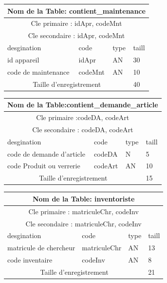 \vspace{2cm}

\begin{tabular}{ |p{5cm}||p{4cm}|p{3cm}|p{3cm}|  }
    \hline
    \multicolumn{4}{|c|}{Nom de la Table: contient\_maintenance } \\
    \hline
    \multicolumn{4}{|c|}{Cle primaire : idApr, codeMnt} \\
    \hline
    \multicolumn{4}{|c|}{Cle secondaire : idApr, codeMnt } \\
    \hline
    \hline
    desgination&code&type&taill \\
    \hline
    id appareil&idApr&AN&30 \\
    code de maintenance&codeMnt&AN&10 \\
    \hline
    \hline
    \multicolumn{3}{|c|}{Taille d’enregistrement} & 40\\
    \hline
\end{tabular}

\vspace{2cm}

\begin{tabular}{ |p{5cm}||p{4cm}|p{3cm}|p{3cm}|  }
    \hline
    \multicolumn{4}{|c|}{Nom de la Table:contient\_demande\_article } \\
    \hline
    \multicolumn{4}{|c|}{Cle primaire :codeDA, codeArt } \\
    \hline
    \multicolumn{4}{|c|}{Cle secondaire : codeDA, codeArt } \\
    \hline
    \hline
    desgination&code&type&taill \\
    \hline
    code de demande d'article&codeDA&N&5 \\
    code Produit ou verrerie&codeArt&AN&10 \\
    \hline
    \hline
    \multicolumn{3}{|c|}{Taille d’enregistrement} & 15\\
    \hline
\end{tabular}

\vspace{2cm}

\begin{tabular}{ |p{5cm}||p{4cm}|p{3cm}|p{3cm}|  }
    \hline
    \multicolumn{4}{|c|}{Nom de la Table: inventoriste } \\
    \hline
    \multicolumn{4}{|c|}{Cle primaire : matriculeChr, codeInv } \\
    \hline
    \multicolumn{4}{|c|}{Cle secondaire : matriculeChr, codeInv  } \\
    \hline
    \hline
    desgination&code&type&taill \\
    \hline
    matricule de chercheur&matriculeChr&AN&13 \\
    code inventaire&codeInv&AN&8 \\
    \hline
    \hline
    \multicolumn{3}{|c|}{Taille d’enregistrement} & 21\\
    \hline
\end{tabular}


